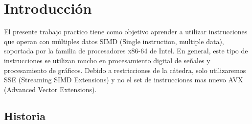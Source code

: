 \section{Introducción}

El presente trabajo practico tiene como objetivo aprender a utilizar instrucciones que operan con múltiples datos SIMD (Single instruction, multiple data), soportada por la familia de procesadores x86-64 de Intel. En general, este tipo de instrucciones se utilizan mucho en procesamiento digital de señales y procesamiento de gráficos. Debido a restricciones de la cátedra, solo utilizaremos SSE (Streaming SIMD Extensions) y no el set de instrucciones mas nuevo AVX (Advanced Vector Extensions).
 
\subsection{Historia}
 
